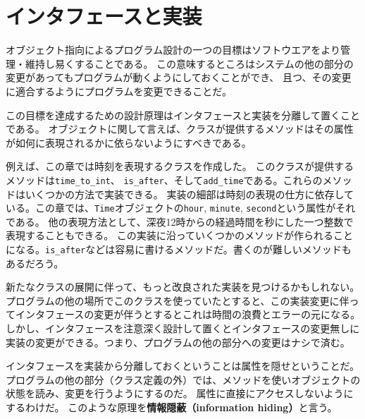 \documentclass[a4j,12pt,makeidx]{jbook}
\begin{document}
\section{インタフェースと実装}
オブジェクト指向によるプログラム設計の一つの目標はソフトウエアをより管理・維持し易くすることである。
この意味するところはシステムの他の部分の変更があってもプログラムが動くようにしておくことができ、
且つ、その変更に適合するようにプログラムを変更できることだ。 \par
この目標を達成するための設計原理はインタフェースと実装を分離して置くことである。
オブジェクトに関して言えば、クラスが提供するメソッドはその属性が如何に表現されるかに依らないようにすべきである。\par
例えば、この章では時刻を表現するクラスを作成した。
このクラスが提供するメソッドは{\tt time\_to\_int}、 {\tt is\_after}、そして{\tt add\_time}である。これらのメソッドはいくつかの方法で実装できる。
実装の細部は時刻の表現の仕方に依存している。この章では、{\tt Time}オブジェクトの{\tt hour}, {\tt minute}, {\tt second}という属性がそれである。
他の表現方法として、深夜12時からの経過時間を秒にした一つ整数で表現することもできる。
この実装に沿っていくつかのメソッドが作られることになる。{\tt is\_after}などは容易に書けるメソッドだ。書くのが難しいメソッドもあるだろう。\par
新たなクラスの展開に伴って、もっと改良された実装を見つけるかもしれない。
プログラムの他の場所でこのクラスを使っていたとすると、この実装変更に伴ってインタフェースの変更が伴うとするとこれは時間の浪費とエラーの元になる。
しかし、インタフェースを注意深く設計して置くとインタフェースの変更無しに実装の変更ができる。つまり、プログラムの他の部分への変更はナシで済む。\par
インタフェースを実装から分離しておくということは属性を隠せということだ。
プログラムの他の部分（クラス定義の外）では、メソッドを使いオブジェクトの状態を読み、変更を行うようにするのだ。
属性に直接にアクセスしないようにするわけだ。
このような原理を{\bf 情報隠蔽（information hiding）}と言う。
%
\end{document}
